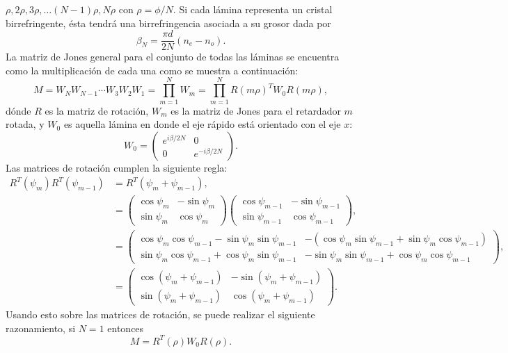 $\rho,2\rho,3\rho,\dots\left(N-1\right)\rho,N\rho$ con
$\rho=\phi/N$. Si cada lámina representa un cristal birrefringente, ésta tendrá una
birrefringencia asociada a su grosor dada por $$\beta_N = \frac{\pi
  d}{2N}\left(n_e-n_o\right).$$
La matriz de Jones general para el conjunto de todas las láminas se
encuentra como la multiplicación de cada una como se muestra a
continuación:
\[ M= W_NW_{N-1}\cdots W_3W_2W_1=\prod_{m=1}^NW_m = \prod_{m=1}^NR(m\rho)^TW_0R(m\rho), \]
dónde $R$ es la matriz de rotación, $W_m$ es la matriz de Jones para
el retardador $m$ rotada, y $W_0$ es aquella lámina en donde el eje rápido está
orientado con el eje $x$:
\begin{equation*}
W_0 =
\begin{pmatrix}
  e^{i\beta/2N} &0 \\ 0 & e^{-i\beta/2N} 
\end{pmatrix}.
\end{equation*}
Las matrices de rotación cumplen la siguiente regla:
\begin{align*}
R^T(\psi_m)R^T(\psi_{m-1}) &= R^T\left(\psi_m+\psi_{m-1}\right),\\
&=
\begin{pmatrix}
  \cos{\psi_m}&  -\sin{\psi_m}\\  \sin{\psi_m}&  \cos{\psi_m}
\end{pmatrix}
\begin{pmatrix}
  \cos{\psi_{m-1}}&  -\sin{\psi_{m-1}}\\  \sin{\psi_{m-1}}&  \cos{\psi_{m-1}}
\end{pmatrix},\\
&=
\begin{pmatrix}
  \cos{\psi_m}\cos{\psi_{m-1}}-\sin{\psi_m}\sin{\psi_{m-1}}&  
-(\cos{\psi_m}\sin{\psi_{m-1}}+\sin{\psi_m} \cos{\psi_{m-1}})\\
  \sin{\psi_m} \cos{\psi_{m-1}}+\cos{\psi_m}\sin{\psi_{m-1}}& 
 -\sin{\psi_m}\sin{\psi_{m-1}}+\cos{\psi_m}\cos{\psi_{m-1}}
\end{pmatrix},  \\
&=\begin{pmatrix}
  \cos{\left(\psi_m+\psi_{m-1}\right)}&  -\sin{\left(\psi_m+\psi_{m-1}\right)}\\
  \sin{\left(\psi_m+\psi_{m-1}\right)}&  \cos{\left(\psi_m+\psi_{m-1}\right)} 
\end{pmatrix}.
\end{align*}
Usando esto sobre las matrices de rotación, se puede realizar el
siguiente razonamiento, si $N=1$ entonces
\begin{equation*}
  M = R^T(\rho)W_0R(\rho).
\end{equation*}
